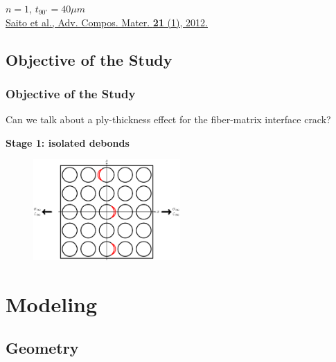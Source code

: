 \documentclass[first,firstsupp,lastsupp,last,hyperref,table]{ETHclass}
\begin{document}
\begin{frame}
\begin{figure}
\end{figure}
\vspace{-0.25cm}
$n=1$, $t_{90^{\circ}}=40\mu m$\\\vspace{5pt}
\pgfmathsetmacro{}
\pgfmathsetmacro{}
{\fontsize{\fontsizeref}{\stretchref} \selectfont \href{https://doi.org/10.1163/156855112X629522}{Saito et al., Adv. Compos. Mater. \textbf{21} (1), 2012.}}
\end{frame}

\subsection{Objective of the Study}

\begin{frame}
\frametitle{\vspace{0.2cm}\small Objective of the Study}
\vspace{-0.5cm}
Can we talk about a ply-thickness effect for the fiber-matrix interface crack?
\centering
\begin{alertblock}{\centering\scriptsize\bf Stage 1: isolated debonds}
\vspace{-0.25cm}
\begin{figure}
\centering
\includegraphics[width=0.5\textwidth]{stage1-isolateddebonds.pdf}
\end{figure}
\end{alertblock}
\end{frame}

\section{Modeling}

\subsection{Geometry}
\end{document}
